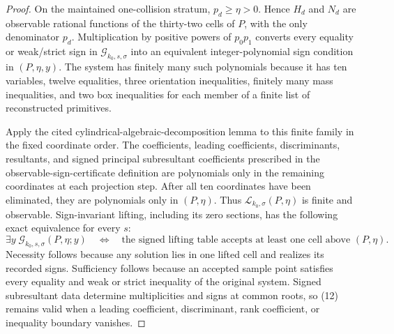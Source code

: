 \documentclass{article}
\begin{document}
\begin{proof}
On the maintained one-collision stratum, \(p_d\geq\eta>0\).  Hence \(H_d\) and \(N_d\) are observable rational functions of the thirty-two cells of \(P\), with the only denominator \(p_d\).  Multiplication by positive powers of \(p_0p_1\) converts every equality or weak/strict sign in \(\mathscr G_{k_0,s,\sigma}\) into an equivalent integer-polynomial sign condition in \((P,\eta,y)\).  The system has finitely many such polynomials because it has ten variables, twelve equalities, three orientation inequalities, finitely many mass inequalities, and two box inequalities for each member of a finite list of reconstructed primitives.

Apply the cited cylindrical-algebraic-decomposition lemma to this finite family in the fixed coordinate order.  The coefficients, leading coefficients, discriminants, resultants, and signed principal subresultant coefficients prescribed in the observable-sign-certificate definition are polynomials only in the remaining coordinates at each projection step.  After all ten coordinates have been eliminated, they are polynomials only in \((P,\eta)\).  Thus \(\mathscr L_{k_0,\sigma}(P,\eta)\) is finite and observable.  Sign-invariant lifting, including its zero sections, has the following exact equivalence for every \(s\):
\[
 \exists y\;\mathscr G_{k_0,s,\sigma}(P,\eta;y)
 \quad\Longleftrightarrow\quad
 \text{the signed lifting table accepts at least one cell above }(P,\eta).
 \tag{12}
\]
Necessity follows because any solution lies in one lifted cell and realizes its recorded signs.  Sufficiency follows because an accepted sample point satisfies every equality and weak or strict inequality of the original system.  Signed subresultant data determine multiplicities and signs at common roots, so (12) remains valid when a leading coefficient, discriminant, rank coefficient, or inequality boundary vanishes.


\end{proof}
\end{document}
